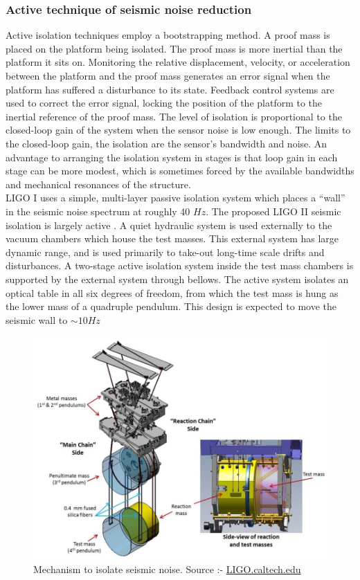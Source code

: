 \subsubsection*{Active technique of seismic noise reduction}
    
Active isolation techniques employ a bootstrapping method. A proof mass is placed on the platform being isolated. The proof mass is more inertial than the platform it sits on. Monitoring the relative displacement, velocity, or acceleration between the platform and the proof mass generates an error signal when the platform has suffered a disturbance to its state. Feedback control systems are used to correct the error signal, locking the position of the platform to the inertial reference of the proof mass. The level of isolation is proportional to the closed-loop gain of the system when the sensor noise is low enough. The limits to the closed-loop gain, the isolation are the sensor’s bandwidth and noise. An advantage to arranging the isolation system in stages is that loop gain in each stage can be more modest, which is sometimes forced by the available bandwidths and mechanical resonances of the structure.\\

LIGO I uses a simple, multi-layer passive isolation system which places a “wall” in the seismic noise spectrum at roughly 40 $Hz$. The proposed LIGO II seismic isolation is largely active \cite{giaime2000active}. A quiet hydraulic system is used externally to the vacuum chambers which house the test masses. This external system has large dynamic range, and is used primarily to take-out long-time scale drifts and disturbances. A two-stage active isolation system inside the test mass chambers is supported by the external system through bellows. The active system isolates an optical table in all six degrees of freedom, from which the test mass is hung as the lower mass of a quadruple pendulum. This design is expected to move the seismic wall to $ \sim 10 Hz$


\begin{figure}[h]
    \centering
    \includegraphics[scale = 1]{images.tex/seismic_isolation.jpg}
    \caption{Mechanism to isolate seismic noise. Source :- \href{https://www.ligo.caltech.edu/page/vibration-isolation}{LIGO.caltech.edu}}
\end{figure}

